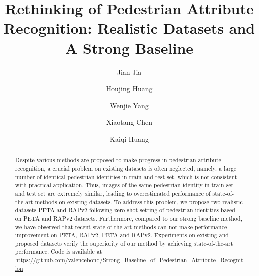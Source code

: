 \documentclass[runningheads]{llncs}
\begin{document}
\pagestyle{headings}
\mainmatter
\def\ECCVSubNumber{5996}  

\title{Rethinking of Pedestrian Attribute Recognition: Realistic Datasets and A Strong Baseline} 

\begin{comment}
\end{comment}



\author{Jian Jia \and Houjing Huang \and Wenjie Yang \and Xiaotang Chen \and Kaiqi Huang}



\maketitle


\begin{abstract}
Despite various methods are proposed to make progress in pedestrian attribute recognition, a crucial problem on existing datasets is often neglected, namely, a large number of identical pedestrian identities in train and test set, which is not consistent with practical application. Thus, images of the same pedestrian identity in train set and test set are extremely similar, leading to overestimated performance of state-of-the-art methods on existing datasets. To address this problem, we propose two realistic datasets PETA\textsubscript{} and RAPv2\textsubscript{} following zero-shot setting of pedestrian identities based on PETA and RAPv2 datasets. Furthermore, compared to our strong baseline method, we have observed that recent state-of-the-art methods can not make performance improvement on PETA, RAPv2, PETA\textsubscript{} and RAPv2\textsubscript{}. Experiments on existing and proposed datasets verify the superiority of our method by achieving state-of-the-art performance. Code is available at \url{https://github.com/valencebond/Strong_Baseline_of_Pedestrian_Attribute_Recognition}

\end{abstract}
\end{document}
